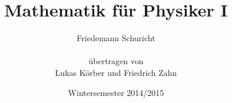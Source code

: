 \documentclass[a4paper,12pt,portrait]{book}
\title{Mathematik f\"ur Physiker I}
\author{Friedemann Schuricht\\ \\ \"ubertragen von\\Lukas K\"orber und Friedrich Zahn}
\date{Wintersemester 2014/2015}
\theoremstyle{theoremstyle}
\begin{document}
\maketitle
\tableofcontents
\pagestyle{fancy}
\renewcommand{\thechapter}{\Roman{chapter}} 
\renewcommand*\thesection{\arabic{section}}
\renewcommand\theequation{\maybe{\arabic{chapter}}\arabic{section}.\arabic{equation}}
\DeclareRobustCommand\maybe[1]{\ifnum#1=\value{chapter}\relax\else\uppercase\expandafter{\romannumeral#1}.\fi}
\setcounter{chapter}{7}




\end{document}
